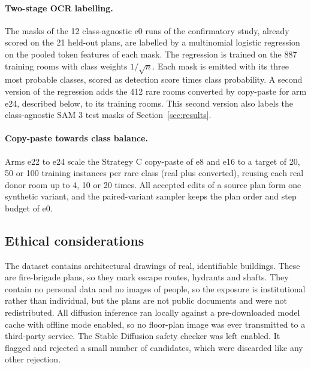 \paragraph{Two-stage OCR labelling.} The masks of the 12 class-agnostic e0
runs of the confirmatory study, already scored on the 21 held-out plans, are
labelled by a multinomial logistic regression on the pooled token features of
each mask. The regression is trained on the 887 training rooms with class
weights $1/\sqrt{n}$. Each mask is emitted with its three most probable
classes, scored as detection score times class probability. A second
version of the regression adds the 412 rare rooms converted by copy-paste for
arm e24, described below, to its training rooms. This second version also
labels the class-agnostic SAM 3 test masks of Section~\ref{sec:results}.

\paragraph{Copy-paste towards class balance.} Arms e22 to e24 scale the
Strategy C copy-paste of e8 and e16 to a target of 20, 50 or 100 training
instances per rare class (real plus converted), reusing each real donor room up
to 4, 10 or 20 times. All accepted edits of a source plan form one synthetic
variant, and the paired-variant sampler keeps the plan order and step budget of
e0.

\subsection{Ethical considerations}

The dataset contains architectural drawings of real, identifiable buildings.
These are fire-brigade plans, so they mark escape routes, hydrants and shafts.
They contain no personal data and no images of people, so the exposure is
institutional rather than individual, but the plans are not public documents and
were not redistributed. All diffusion inference ran locally against a
pre-downloaded model cache with offline mode enabled, so no floor-plan image was
ever transmitted to a third-party service. The Stable Diffusion safety checker
was left enabled. It flagged and rejected a small number of candidates, which
were discarded like any other rejection.

